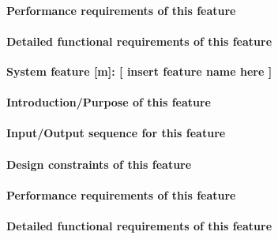 \documentclass[letterpaper, 10pt, draftclsnofoot, onecolumn]{IEEEtran}
\begin{document}
\paragraph[Performance requirements of this
feature]{\rmfamily\bfseries\color{black}
Performance requirements of this feature}

\paragraph[Detailed functional requirements of this
feature]{\rmfamily\bfseries\color{black}
Detailed functional requirements of this feature}


{\rmfamily\bfseries\color{black} System
feature [m]: [ insert feature name here ]}

\paragraph[\ Introduction/Purpose of this feature]{\rmfamily\bfseries\color{black}Introduction/Purpose of this feature}

\paragraph[Input/Output sequence for this
feature]{\rmfamily\bfseries\color{black}
Input/Output sequence for this feature}

\paragraph[Design constraints of this
feature]{\rmfamily\bfseries\color{black} Design
constraints of this feature}

\paragraph[Performance requirements of this
feature]{\rmfamily\bfseries\color{black}
Performance requirements of this feature}

\paragraph[Detailed functional requirements of this
feature]{\rmfamily\bfseries\color{black}
Detailed functional requirements of this feature}
\end{document}
